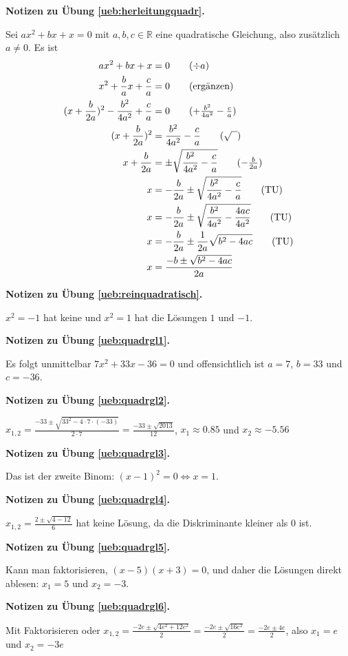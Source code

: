 \documentclass[%
11pt,%
twoside,%
titlepage,%
german,%
headsepline%
]{scrartcl}
\newcommand{\concatueb}[1]{ueb:#1}%
\newcommand{\concatlsg}[1]{lsg:#1}%
\newenvironment{lsg}[1]{%
    \par\noindent\textbf{Notizen zu Übung \ref{\concatueb{#1}}.}%
    \label{\concatlsg{#1}}
}{%
    \par%
}
\begin{document}
\begin{lsg}{herleitungquadr}
    Sei $ax^2+bx+x=0$ mit $a,b,c\in\mathbb{R}$ eine quadratische Gleichung, also zusätzlich $a\neq0$. Es ist
    \begin{align*}
        ax^2+bx+x &= 0\tag{$\div a$}\\
        x^2+\frac{b}{a}x+\frac{c}{a} &= 0\tag{ergänzen}\\
        (x+\frac{b}{2a})^2-\frac{b^2}{4a^2}+\frac{c}{a} &= 0\tag{$+\frac{b^2}{4a^2}-\frac{c}{a}$}\\
        (x+\frac{b}{2a})^2 &= \frac{b^2}{4a^2}-\frac{c}{a}\tag{$\sqrt{\phantom{x}}$}\\
        x+\frac{b}{2a} &= \pm\sqrt{\frac{b^2}{4a^2}-\frac{c}{a}}\tag{$-\frac{b}{2a}$}\\
        x &= -\frac{b}{2a}\pm\sqrt{\frac{b^2}{4a^2}-\frac{c}{a}}\tag{TU}\\
        x &= -\frac{b}{2a}\pm\sqrt{\frac{b^2}{4a^2}-\frac{4ac}{4a^2}}\tag{TU}\\
        x &= -\frac{b}{2a}\pm\frac{1}{2a}\sqrt{b^2-4ac}\tag{TU}\\
        x &= \frac{-b\pm\sqrt{b^2-4ac}}{2a}
    \end{align*}
\end{lsg}
\begin{lsg}{reinquadratisch}
    $x^2=-1$ hat keine und $x^2=1$ hat die Lösungen $1$ und $-1$.
\end{lsg}
\begin{lsg}{quadrgl1}
    Es folgt unmittelbar $7x^2+33x-36=0$ und offensichtlich ist $a=7$, $b=33$ und $c=-36$.
\end{lsg}
\begin{lsg}{quadrgl2}
    $x_{1,2}=\frac{-33\pm\sqrt{33^2-4\cdot7\cdot(-33)}}{2\cdot7}=\frac{-33\pm\sqrt{2013}}{12}$, $x_1\approx0.85$ und $x_2\approx-5.56$
\end{lsg}
\begin{lsg}{quadrgl3}
    Das ist der zweite Binom: $(x-1)^2=0\Leftrightarrow x=1$.
\end{lsg}
\begin{lsg}{quadrgl4}
    $x_{1,2}=\frac{2\pm\sqrt{4-12}}{6}$ hat keine Lösung, da die Diskriminante kleiner als 0 ist.
\end{lsg}
\begin{lsg}{quadrgl5}
    Kann man faktorisieren, $(x-5)(x+3)=0$, und daher die Lösungen direkt ablesen: $x_1=5$ und $x_2=-3$.
\end{lsg}
\begin{lsg}{quadrgl6}
    Mit Faktorisieren oder $x_{1,2}=\frac{-2e\pm\sqrt{4e^2+12e^2}}{2}=\frac{-2e\pm\sqrt{16e^2}}{2}=\frac{-2e\pm4e}{2}$, also $x_1=e$ und $x_2=-3e$
\end{lsg}
\end{document}

